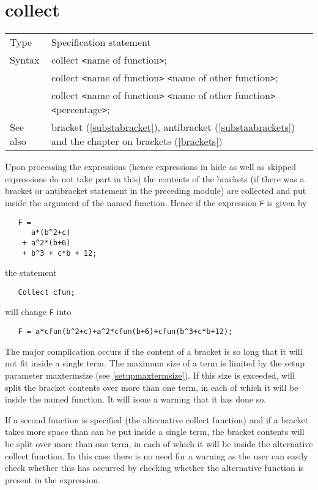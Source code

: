 \section{collect}
\label{substacollect}

\noindent \begin{tabular}{ll}
Type & Specification statement\\
Syntax & collect {\tt<}name of function{\tt>}; \\
       & collect {\tt<}name of function{\tt>} 
        {\tt<}name of other function{\tt>}; \\
       & collect {\tt<}name of function{\tt>} 
        {\tt<}name of other function{\tt>} {\tt<}percentage{\tt>};
\\ See also & bracket (\ref{substabracket}), antibracket 
     (\ref{substaabrackets}) and the chapter on brackets 
     (\ref{brackets})
\end{tabular} \vspace{4mm}

\noindent Upon processing the expressions (hence expressions 
in hide as well as skipped expressions do not take part in this) the 
contents of the brackets (if there was a bracket or 
antibracket statement in the preceding module) are 
collected and put inside the argument of the named function. Hence if the 
expression \verb:F: is given by
\begin{verbatim}
   F =
      a*(b^2+c)
    + a^2*(b+6)
    + b^3 + c*b + 12;
\end{verbatim}
the statement
\begin{verbatim}
   Collect cfun;
\end{verbatim}
will change \verb:F: into
\begin{verbatim}
   F = a*cfun(b^2+c)+a^2*cfun(b+6)+cfun(b^3+c*b+12);
\end{verbatim}
The major complication occurs if the content of a 
bracket is so long that it will not fit inside a single term. The maximum 
size of a term is limited by the setup parameter 
maxtermsize (see \ref{setupmaxtermsize}). If this size 
is exceeded, {\FORM} will split the bracket contents over more than one term, 
in each of which it will be inside the named function. It will issue a 
warning that it has done so. \vspace{4mm}

\noindent If a second function is specified (the 
alternative collect function) and if a bracket takes 
more space than can be put inside a single term, the bracket contents will 
be split over more than one term, in each of which it will be inside the 
alternative collect function. In this case there is no need for a 
warning 
as the user can easily check whether this has occurred by checking whether 
the alternative function is present in the expression. \vspace{4mm}


